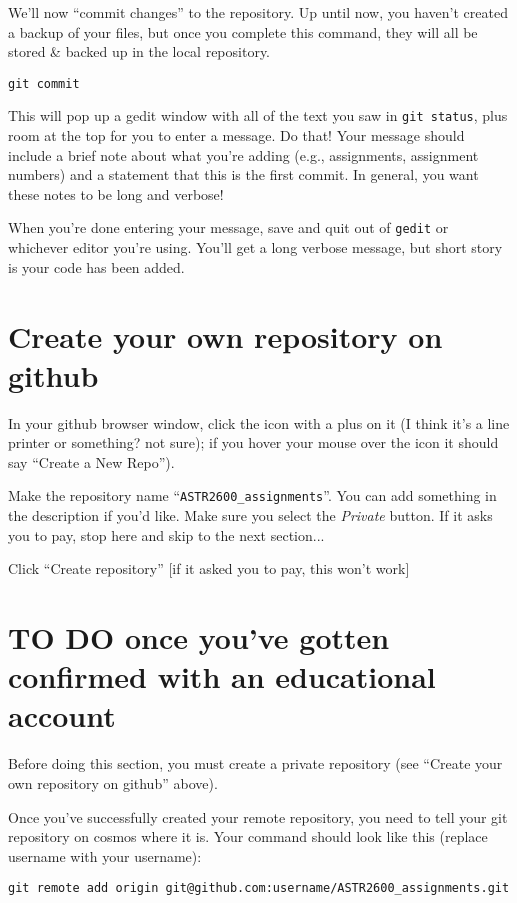 \documentclass{article}
\begin{document}
\begin{spacing}{1.0}
We'll now “commit changes” to the repository.  Up until now, you haven't
created a backup of your files, but once you complete this command, they will
all be stored \& backed up in the local repository.

\verb|git commit|

This will pop up a gedit window with all of the text you saw in 
\verb|git status|, plus room at the top for you to enter a message.  Do that!  Your
message should include a brief note about what you're adding (e.g.,
assignments, assignment numbers) and a statement that this is the first commit.  
In general, you want these notes to be long and verbose!

When you're done entering your message, save and quit out of \verb|gedit| or
whichever editor you're using.  You'll get a long verbose message, but short
story is your code has been added.

\section{Create your own repository on github}

In your github browser window, click the icon with a plus on it (I think it's a
line printer or something?  not sure); if you hover your mouse over the icon it
should say “Create a New Repo”).

Make the repository name “\verb|ASTR2600_assignments|”.  You can add something
in the description if you'd like.  Make sure you select the \emph{Private}
button.  If it asks you to pay, stop here and skip to the next section...


Click “Create repository” [if it asked you to pay, this won't work]


\section{TO DO once you've gotten confirmed with an educational account}
Before doing this section, you must create a private repository (see ``Create
your own repository on github'' above).

Once you've successfully created your remote repository, you need to tell your git repository
on cosmos where it is. Your command should look like this (replace username with your username):

\verb|git remote add origin git@github.com:username/ASTR2600_assignments.git|


\end{spacing}
\end{document}
